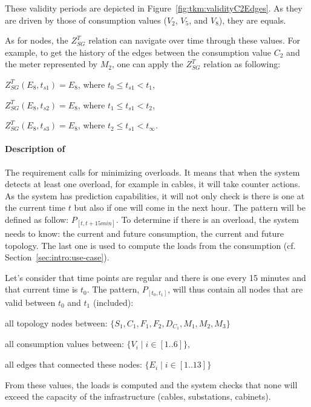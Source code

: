 These validity periods are depicted in Figure~\ref{fig:tkm:validityC2Edges}.
As they are driven by those of consumption values ($V_2$, $V_5$, and $V_8$), they are equals.

As for nodes, the $Z^T_{SG}$ relation can navigate over time through these values.
For example, to get the history of the edges between the consumption value $C_2$ and the meter represented by $M_2$, one can apply the $Z^T_{SG}$ relation as following:
\begin{condItemize}
	\item $Z^T_{SG}(E_8, t_{s1}) = E_8$, where $t_0 \leqslant t_{s1} < t_1$,
	\item $Z^T_{SG}(E_8, t_{s2}) = E_8$, where $t_1 \leqslant t_{s1} < t_2$,
	\item $Z^T_{SG}(E_8, t_{s3}) = E_8$, where $t_2 \leqslant t_{s1} < t_\infty$.
\end{condItemize}


\paragraph{Description of }
The requirement calls for minimizing overloads.
It means that when the system detects at least one overload, for example in cables, it will take counter actions.
As the system has prediction capabilities, it will not only check is there is one at the current time $t$ but also if one will come in the next hour.
The pattern will be defined as follow: $P_{[t, t+15min]}$.
To determine if there is an overload, the system needs to know: the current and future consumption, the current and future topology.
The last one is used to compute the loads from the consumption (cf. Section~\ref{sec:intro:use-case}).

Let's consider that time points are regular and there is one every 15 minutes and that current time is $t_0$.
The pattern, $P_{[t_0, t_1]}$, will thus contain all nodes that are valid between $t_0$ and $t_1$ (included):
\begin{condItemize}
	\item all topology nodes between: $\{S_1, C_1, F_1, F_2, D_{C_1}, M_1, M_2, M_3\}$
	\item all consumption values between: $\{V_i \mid i \in [1..6]\}$,
	\item all edges that connected these nodes: $\{E_i \mid i \in [1..13]\}$
\end{condItemize}

From these values, the loads is computed and the system checks that none will exceed the capacity of the infrastructure (cables, substations, cabinets).

